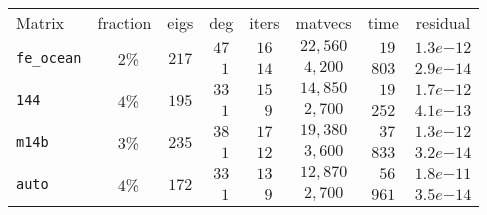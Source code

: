 \begin{tabular}{l|c|c|c|c|c|c|c}
\hline
\multirow{2}{*}{Matrix} & \multirow{2}{*}{fraction} & \multirow{2}{*}{eigs} & \multirow{2}{*}{deg} & \multirow{2}{*}{iters} & \multirow{2}{*}{matvecs} & \multirow{2}{*}{time} & \multirow{2}{*}{residual} \\
 & & & & & & & \\\hline
\hline
\multirow{2}{*}{\texttt{fe\_ocean}} & \multirow{2}{*}{$\phantom{0}2$\%} & \multirow{2}{*}{$217$} & $47$ & $16$ & $22,560$ & $\phantom{0}19$ & $1.3e{-12}$ \\
 & & & $\phantom{0}1$ & $14$ & $4,200$ & $803$ & $2.9e{-14}$ \\\hline
\multirow{2}{*}{\texttt{144}} & \multirow{2}{*}{$\phantom{0}4$\%} & \multirow{2}{*}{$195$} & $33$ & $15$ & $14,850$ & $\phantom{0}19$ & $1.7e{-12}$ \\
 & & & $\phantom{0}1$ & $\phantom{0}9$ & $2,700$ & $252$ & $4.1e{-13}$ \\\hline
\multirow{2}{*}{\texttt{m14b}} & \multirow{2}{*}{$\phantom{0}3$\%} & \multirow{2}{*}{$235$} & $38$ & $17$ & $19,380$ & $\phantom{0}37$ & $1.3e{-12}$ \\
 & & & $\phantom{0}1$ & $12$ & $3,600$ & $833$ & $3.2e{-14}$ \\\hline
\multirow{2}{*}{\texttt{auto}} & \multirow{2}{*}{$\phantom{0}4$\%} & \multirow{2}{*}{$172$} & $33$ & $13$ & $12,870$ & $\phantom{0}56$ & $1.8e{-11}$ \\
 & & & $\phantom{0}1$ & $\phantom{0}9$ & $2,700$ & $961$ & $3.5e{-14}$ \\\hline
\end{tabular}